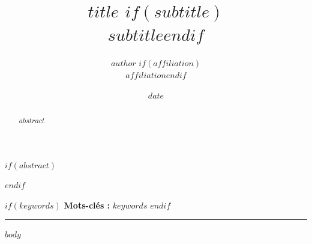 \documentclass[11pt,a4paper]{article}
\title{\bfseries $title$ $if(subtitle)$\\[0.3em]\large\mdseries $subtitle$$endif$}
\author{$author$ $if(affiliation)$\\[0.2em]\small $affiliation$$endif$}
\date{$date$}
\begin{document}
\maketitle
\thispagestyle{fancy}

$if(abstract)$
\begin{abstract}
$abstract$
\end{abstract}
$endif$

$if(keywords)$
\noindent\textbf{Mots-clés :} $keywords$
$endif$

\vspace{1em}
\hrule
\vspace{1.5em}

$body$
\end{document}
